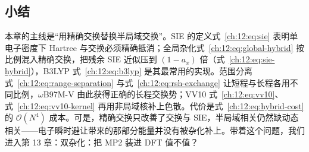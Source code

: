 \subsection*{小结}
本章的主线是“用精确交换替换半局域交换”。SIE 的定义式~\eqref{ch:12:eq:sie} 表明单电子密度下 Hartree 与交换必须精确抵消；全局杂化式~\eqref{ch:12:eq:global-hybrid} 按比例混入精确交换，把残余 SIE 近似压到 $(1-a_x)$ 倍（式~\eqref{ch:12:eq:sie-hybrid}），B3LYP 式~\eqref{ch:12:eq:b3lyp} 是其最常用的实现。范围分离式~\eqref{ch:12:eq:range-separation} 与式~\eqref{ch:12:eq:rsh-exchange} 让短程与长程各用不同比例，$\omega$B97M-V 由此获得正确的长程交换势；VV10 式~\eqref{ch:12:eq:vv10}、式~\eqref{ch:12:eq:vv10-kernel} 再用非局域核补上色散。代价是式~\eqref{ch:12:eq:hybrid-cost} 的 $\mathcal{O}(N^4)$ 成本。可是，精确交换只改善了交换与 SIE，半局域相关仍然缺动态相关——电子瞬时避让带来的那部分能量并没有被杂化补上。带着这个问题，我们进入第 13 章：双杂化：把 MP2 装进 DFT 值不值？
